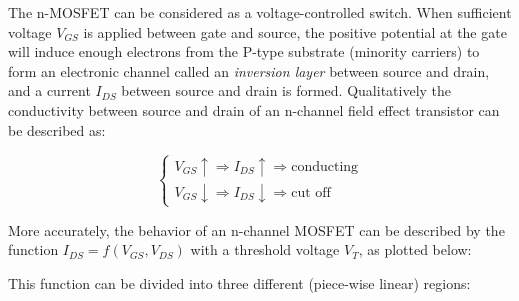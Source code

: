 



The n-MOSFET can be considered as a voltage-controlled switch. When sufficient
voltage $V_{GS}$ is applied between gate and source, the positive potential at 
the gate will induce enough electrons from the P-type substrate (minority 
carriers) to form an electronic channel called an {\em inversion layer} between
source and drain, and a current $I_{DS}$ between source and drain is formed. 
Qualitatively the conductivity between source and drain of an n-channel field 
effect transistor can be described as:

\[ 
\left\{ \begin{array}{l}
  V_{GS} \uparrow \Longrightarrow I_{DS} \uparrow \Longrightarrow \mbox{conducting} \\
  V_{GS} \downarrow \Longrightarrow I_{DS} \downarrow \Longrightarrow \mbox{cut off} 
\end{array} \right. 	
\]


More accurately, the behavior of an n-channel MOSFET can be described by the 
function $I_{DS}=f(V_{GS}, V_{DS})$ with a threshold voltage $V_T$, as plotted 
below:



This function can be divided into three different (piece-wise linear) regions:

